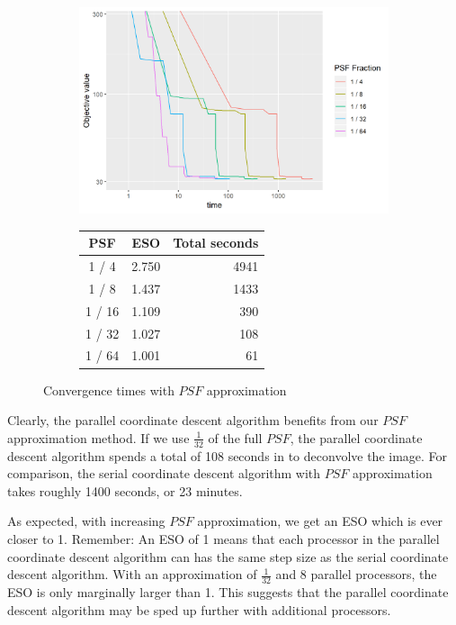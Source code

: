 \begin{figure}[h]
	\centering
	\begin{subfigure}{0.6\linewidth}
		\includegraphics[width=1.0\linewidth]{./chapters/05.pcdm/parameters/psfSize.png}
	\end{subfigure}
	\begin{subfigure}{0.35\linewidth}
		\begin{tabular}{c | r | r}
			PSF & ESO & Total seconds \\ \hline
			1 / 4 & 2.750 & 4941 \\
			1 / 8 & 1.437 & 1433 \\
			1 / 16 & 1.109 & 390 \\
			1 / 32 & 1.027 & 108 \\
			1 / 64 & 1.001 & 61 \\
		\end{tabular}
	\end{subfigure}
	\caption{Convergence times with $PSF$ approximation}
	\label{pcdm:results:psf}
\end{figure}

Clearly, the parallel coordinate descent algorithm benefits from our $PSF$ approximation method. If we use $\frac{1}{32}$ of the full $PSF$, the parallel coordinate descent algorithm spends a total of 108 seconds in to deconvolve the image. For comparison, the serial coordinate descent algorithm with $PSF$ approximation takes roughly 1400 seconds, or 23 minutes.

As expected, with increasing $PSF$ approximation, we get an ESO which is ever closer to 1. Remember: An ESO of 1 means that each processor in the parallel coordinate descent algorithm can has the same step size as the serial coordinate descent algorithm. With an approximation of $\frac{1}{32}$ and 8 parallel processors, the ESO is only marginally larger than 1. This suggests that the parallel coordinate descent algorithm may be sped up further with additional processors.

